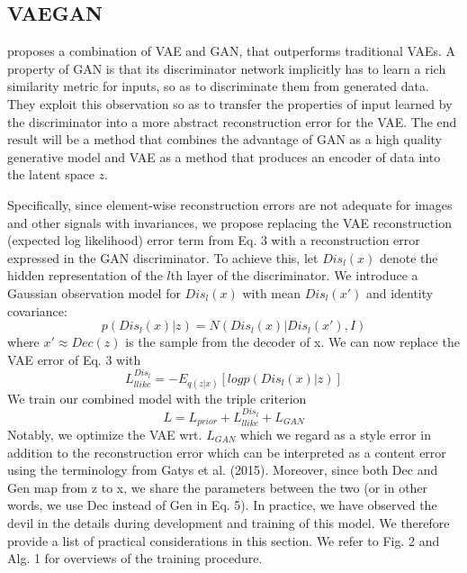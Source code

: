 \subsection{VAEGAN}
\cite{larsen2016autoencoding} proposes a combination of VAE and GAN, that outperforms traditional VAEs. A property of GAN is that its discriminator network implicitly has to learn a rich similarity metric for inputs, so as to discriminate them from generated data. They exploit this observation so as to transfer the properties of input learned by the discriminator into a more abstract reconstruction error for the VAE. The end result will be a method that combines the advantage of GAN as a high quality generative model and VAE as a method that produces an encoder of data into the latent space $z$.

Specifically, since element-wise reconstruction errors are not adequate for images and other signals with invariances, we propose replacing the VAE reconstruction (expected log likelihood) error term from Eq. 3 with a reconstruction error expressed in the GAN discriminator. To achieve this, let $Dis_{l}(x)$ denote the hidden representation of the $l$th layer of the discriminator. We introduce a Gaussian observation model for $Dis_{l}(x)$ with mean $Dis_{l}(x')$ and identity covariance:
\begin{equation}
	p(Dis_{l}(x)|z) = N(Dis_{l}(x)| Dis_{l}(x'), I)
\end{equation}
where $x' \approx Dec(z)$ is the sample from the decoder of x. We can now replace the VAE error of Eq. 3 with 
\begin{equation}
	L^{Dis_l}_{llike} = - E_{q(z|x)}[log p(Dis_{l}(x)|z)]
\end{equation}
We train our combined model with the triple criterion
\begin{equation}
	L = L_{prior} + L^{Dis_l}_{llike} + L_{GAN}
\end{equation}
Notably, we optimize the VAE wrt. $L_{GAN}$ which we regard as a style error in addition to the reconstruction error which can be interpreted as a content error using the terminology from Gatys et al. (2015). Moreover, since both Dec and Gen map from z to x, we share the parameters between the two (or in other words, we use Dec instead of Gen in Eq. 5). In practice, we have observed the devil in the details during development and training of this model. We therefore provide a list of practical considerations in this section. We refer to Fig. 2 and Alg. 1 for overviews of the training procedure.